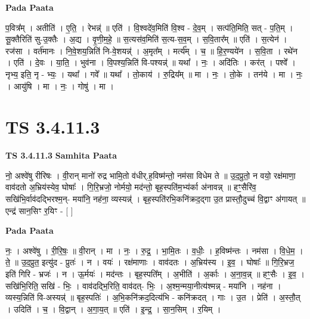 \documentclass[17pt]{extarticle}
\begin{document}
\textbf{Pada Paata} \newline

प॒वित्र᳚म् । अतीति॑ । ए॒ति॒ । रेभन्न्॑ ॥ एति॑ । वि॒श्वदे॑व॒मिति॑ वि॒श्व - दे॒व॒म् । सत्प॑ति॒मिति॒ सत् - प॒ति॒म् । सू॒क्तैरिति॑ सु-उ॒क्तैः । अ॒द्य । वृ॒णी॒म॒हे॒ ॥ स॒त्यस॑व॒मिति॑ स॒त्य-स॒व॒म् । स॒वि॒तार᳚म् ॥ एति॑ । स॒त्येन॑ । रज॑सा । वर्त॑मानः । नि॒वे॒शय॒न्निति॑ नि-वे॒शयन्न्॑ । अ॒मृत᳚म् । मर्त्य᳚म् । च॒ ॥ हि॒र॒ण्यये॑न । स॒वि॒ता । रथे॑न । एति॑ । दे॒वः । या॒ति॒ । भुव॑ना । वि॒पश्य॒न्निति॑ वि-पश्यन्न्॑ ॥ यथा᳚ । नः॒ । अदि॑तिः । कर॑त् । पश्वे᳚ । नृभ्य॒ इति॒ नृ - भ्यः॒ । यथा᳚ । गवे᳚ ॥ यथा᳚ । तो॒काय॑ । रु॒द्रिय᳚म् ॥ मा । नः॒ । तो॒के । तन॑ये । मा । नः॒ । आयु॑षि । मा । नः॒ । गोषु॑ । मा ।  \newline




\section*{ TS 3.4.11.3 }

\textbf{TS 3.4.11.3 } \newline
\textbf{Samhita Paata} \newline

नो॒ अश्वे॑षु रीरिषः । वी॒रान् मानो॑ रुद्र भामि॒तो व॑धीर्.ह॒विष्म॑न्तो॒ नम॑सा विधेम ते ॥ उ॒द॒प्रुतो॒ न वयो॒ रक्ष॑माणा॒ वाव॑दतो अ॒भ्रिय॑स्येव॒ घोषाः᳚ । गि॒रि॒भ्रजो॒ नोर्मयो॒ मद॑न्तो॒ बृह॒स्पति॑म॒भ्य॑र्का अ॑नावन्न् ॥ हꣳ॒॒सैरि॑व॒ सखि॑भि॒र्वाव॑दद्भिरश्म॒न्- मया॑नि॒ नह॑ना॒ व्यस्यन्न्॑ । बृह॒स्पति॑रभि॒कनि॑क्रद॒द्गा उ॒त प्रास्तौ॒दुच्च॑ वि॒द्वाꣳ अ॑गायत् ॥एन्द्र॑ सान॒सिꣳ र॒यिꣳ - [  ] \newline

\textbf{Pada Paata} \newline

नः॒ । अश्वे॑षु । री॒रि॒षः॒ ॥ वी॒रान् । मा । नः॒ । रु॒द्र॒ । भा॒मि॒तः । व॒धीः॒ । ह॒विष्म॑न्तः । नम॑सा । वि॒धे॒म॒ । ते॒ ॥ उ॒द॒प्रुत॒ इत्यु॑द - प्रुतः॑ । न । वयः॑ । रक्ष॑माणाः । वाव॑दतः । अ॒भ्रिय॑स्य । इ॒व॒ । घोषाः᳚ ॥ गि॒रि॒भ्रज॒ इति॑ गिरि - भ्रजः॑ । न । ऊ॒र्मयः॑ । मद॑न्तः । बृह॒स्पति᳚म् । अ॒भीति॑ । अ॒र्काः । अ॒ना॒व॒न्न् ॥ हꣳ॒॒सैः । इ॒व॒ । सखि॑भि॒रिति॒ सखि॑ - भिः॒ । वाव॑दद्भि॒रिति॒ वाव॑दत्- भिः॒ । अ॒श्म॒न्मया॒नीत्य॑श्मन्न् - मया॑नि । नह॑ना । व्यस्य॒न्निति॑ वि-अस्यन्न्॑ ॥ बृह॒स्पतिः॑ । अ॒भि॒कनि॑क्रद॒दित्य॑भि - कनि॑क्रदत् । गाः । उ॒त । प्रेति॑ । अ॒स्तौ॒त् । उदिति॑ । च॒ । वि॒द्वान् । अ॒गा॒य॒त् ॥ एति॑ । इ॒न्द्र॒ । सा॒न॒सिम् । र॒यिम् ।  \newline
\end{document}

